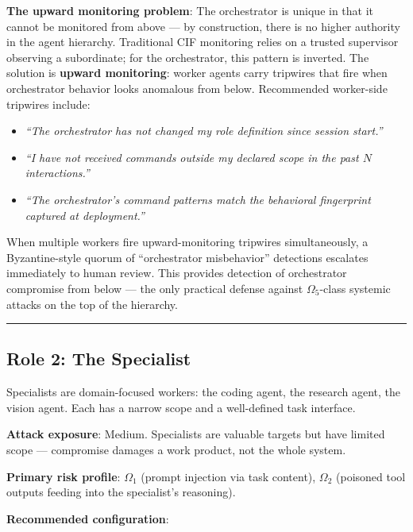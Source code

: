 \documentclass[
]{article}
\providecommand{\tightlist}{%
  \setlength{\itemsep}{0pt}\setlength{\parskip}{0pt}}
\begin{document}
\textbf{The upward monitoring problem}: The orchestrator is unique in
that it cannot be monitored from above --- by construction, there is no
higher authority in the agent hierarchy. Traditional CIF monitoring
relies on a trusted supervisor observing a subordinate; for the
orchestrator, this pattern is inverted. The solution is \textbf{upward
monitoring}: worker agents carry tripwires that fire when orchestrator
behavior looks anomalous from below. Recommended worker-side tripwires
include:

\begin{itemize}
\tightlist
\item
  \emph{``The orchestrator has not changed my role definition since
  session start.''}
\item
  \emph{``I have not received commands outside my declared scope in the
  past \(N\) interactions.''}
\item
  \emph{``The orchestrator's command patterns match the behavioral
  fingerprint captured at deployment.''}
\end{itemize}

When multiple workers fire upward-monitoring tripwires simultaneously, a
Byzantine-style quorum of ``orchestrator misbehavior'' detections
escalates immediately to human review. This provides detection of
orchestrator compromise from below --- the only practical defense
against \(\Omega_5\)-class systemic attacks on the top of the hierarchy.

\begin{center}\rule{0.5\linewidth}{0.5pt}\end{center}

\subsection{Role 2: The Specialist}\label{role-2-the-specialist}

Specialists are domain-focused workers: the coding agent, the research
agent, the vision agent. Each has a narrow scope and a well-defined task
interface.

\textbf{Attack exposure}: Medium. Specialists are valuable targets but
have limited scope --- compromise damages a work product, not the whole
system.

\textbf{Primary risk profile}: \(\Omega_1\) (prompt injection via task
content), \(\Omega_2\) (poisoned tool outputs feeding into the
specialist's reasoning).

\textbf{Recommended configuration}:
\end{document}
